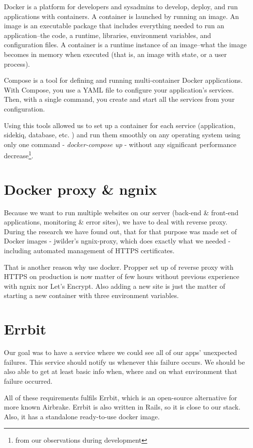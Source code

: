Docker is a platform for developers and sysadmins to develop, deploy, and run applications with containers. A container is launched by running an image. An image is an executable package that includes everything needed to run an application--the code, a runtime, libraries, environment variables, and configuration files. A container is a runtime instance of an image--what the image becomes in memory when executed (that is, an image with state, or a user process).\cite{docker_def}

Compose is a tool for defining and running multi-container Docker applications. With Compose, you use a YAML file to configure your application’s services. Then, with a single command, you create and start all the services from your configuration.\cite{docker_compose_def}

Using this tools allowed us to set up a container for each service (application, sidekiq, database, etc. ) and run them smoothly on any operating system using only one command - \textit{docker-compose up} - without any significant performance decrease\footnote{from our observations during development}.

\section{Docker proxy \& ngnix}
Because we want to run multiple websites on our server (back-end \& front-end applications, monitoring \& error sites), we have to deal with reverse proxy. During the research we have found out, that for that purpose was made set of Docker images - jwilder's ngnix-proxy, which does exactly what we needed - including automated management of HTTPS certificates. 

That is another reason why use docker. Propper set up of reverse proxy with HTTPS on production is now matter of few hours without previous experience with ngnix nor Let's Encrypt. Also adding a new site is just the matter of starting a new container with three environment variables.

\section{Errbit}
Our goal was to have a service where we could see all of our apps' unexpected failures. This service should notify us whenever this failure occurs. We should be also able to get at least basic info when, where and on what environment that failure occurred.

All of these requirements fulfils Errbit, which is an open-source alternative for more known Airbrake. Errbit is also written in Rails, so it is close to our stack. Also, it has a standalone ready-to-use docker image. 

